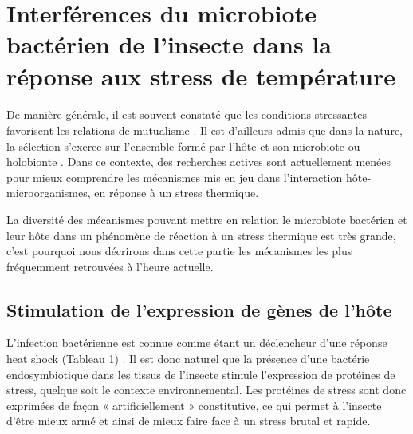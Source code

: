 \section{Interférences du microbiote bactérien de l'insecte dans la réponse aux stress de température} %

\paragraph*{}
De manière générale, il est souvent constaté que les conditions stressantes favorisent les relations de mutualisme \cite{meadows2013}.
Il est d'ailleurs admis que dans la nature, la sélection s'exerce sur l'ensemble formé par l'hôte et son microbiote ou holobionte \cite{rosenberg2008}.
Dans ce contexte, des recherches actives sont actuellement menées pour mieux comprendre les mécanismes mis en jeu dans l’interaction hôte-microorganismes, en réponse à un stress thermique.

La diversité des mécanismes pouvant mettre en relation le microbiote bactérien et leur hôte dans un phénomène de réaction à un stress thermique est très grande, c'est pourquoi nous décrirons dans cette partie les mécanismes les plus fréquemment retrouvées à l'heure actuelle.

\subsection{Stimulation de l'expression de gènes de l'hôte}

L'infection bactérienne est connue comme étant un déclencheur d'une réponse heat shock (Tableau 1) \cite{sorensen2003}.
Il est donc naturel que la présence d'une bactérie endosymbiotique dans les tissus de l'insecte stimule l'expression de protéines de stress, quelque soit le contexte environnemental.
Les protéines de stress sont donc exprimées de façon « artificiellement » constitutive, ce qui permet à l'insecte d'être mieux armé et ainsi de mieux faire face à un stress brutal et rapide.

